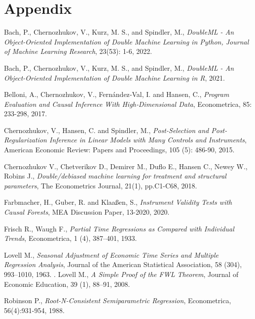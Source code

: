 \appendix
\renewcommand{\thesubsection}{\Alph{subsection}}
\setcounter{subsection}{0} 
\renewcommand{\thetable}{\Alph{table}}
\renewcommand{\thefigure}{\Alph{figure}}
\setcounter{table}{0} 
\section*{Appendix}

\begin{thebibliography}{10}
	
Bach, P., Chernozhukov, V., Kurz, M. S., and Spindler, M., 
\textit{DoubleML - An Object-Oriented Implementation of Double Machine Learning in Python, Journal of Machine Learning Research}, 23(53): 1-6, 
2022.

Bach, P., Chernozhukov, V., Kurz, M. S., and Spindler, M., 
\textit{DoubleML - An Object-Oriented Implementation of Double Machine Learning in R}, 
2021.
	
Belloni, A., Chernozhukov, V., Fernández‐Val, I. and Hansen, C., 
\textit{Program Evaluation and Causal Inference With High‐Dimensional Data}, Econometrica, 85: 233-298,
2017.

Chernozhukov, V., Hansen, C. and Spindler, M., 
\textit{Post-Selection and Post-Regularization Inference in Linear
Models with Many Controls and Instruments},
American Economic Review: Papers and Proceedings, 105 (5): 486-90,
2015.
    
Chernozhukov V., Chetverikov D., Demirer M., Duflo E., Hansen C., Newey W.,  Robins J.,
  \textit{Double/debiased machine learning for treatment and structural parameters},
  The Econometrics Journal, 
   21(1), pp.C1-C68,
  2018.

Farbmacher, H., Guber, R. and Klaaßen, S.,
\textit{Instrument Validity Tests with Causal Forests}, 
MEA Discussion Paper, 13-2020,
2020.

  Frisch R., Waugh F.,
  \textit{Partial Time Regressions as Compared with Individual Trends}, 
  Econometrica, 1 (4), 
  387–401,
  1933. 
  
  Lovell M.,
  \textit{Seasonal Adjustment of Economic Time Series and Multiple Regression Analysis},
   Journal of the American Statistical Association,
    58 (304), 
    993–1010,
    1963.
    .
  Lovell M.,
   \textit{A Simple Proof of the FWL Theorem},
    Journal of Economic Education,
     39 (1), 88–91,
   	2008.
  
  
Robinson P.,  
\textit{Root-N-Consistent Semiparametric
Regression}, 
Econometrica,
 56(4):931-954,
 1988.

\end{thebibliography}


